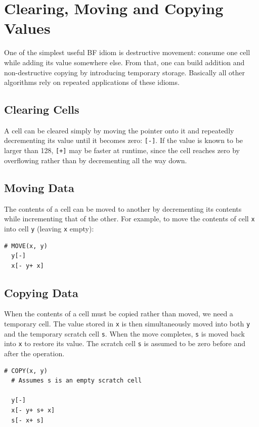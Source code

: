 \section{Clearing, Moving and Copying Values}
One of the simplest useful BF idiom is destructive movement: consume one cell while adding its value somewhere else. From that, one can build addition and non-destructive copying by introducing temporary storage. Basically all other algorithms rely on repeated applications of these idioms.

\subsection{Clearing Cells}
A cell can be cleared simply by moving the pointer onto it and repeatedly decrementing its value until it becomes zero: \texttt{[-]}. If the value is known to be larger than 128, \texttt{[+]} may be faster at runtime, since the cell reaches zero by overflowing rather than by decrementing all the way down.

\subsection{Moving Data}
The contents of a cell can be moved to another by decrementing its contents while incrementing that of the other. For example, to move the contents of cell \texttt{x} into cell \texttt{y} (leaving \texttt{x} empty):

\vspace{0.5cm}\noindent\begin{minipage}{\textwidth}
\begin{lstlisting}[style=brainfuck]
  # MOVE(x, y)
  y[-]
  x[- y+ x]
\end{lstlisting}
\end{minipage}

\subsection{Copying Data}
When the contents of a cell must be copied rather than moved, we need a temporary cell. The value stored in \texttt{x} is then simultaneously moved into both \texttt{y} and the temporary scratch cell \texttt{s}. When the move completes, \texttt{s} is moved back into \texttt{x} to restore its value. The scratch cell \texttt{s} is assumed to be zero before and after the operation.

\vspace{0.5cm}\noindent\begin{minipage}{\textwidth}
\begin{lstlisting}[style=brainfuck]
  # COPY(x, y)
  # Assumes s is an empty scratch cell
  
  y[-]
  x[- y+ s+ x]
  s[- x+ s]
\end{lstlisting}
\end{minipage}


